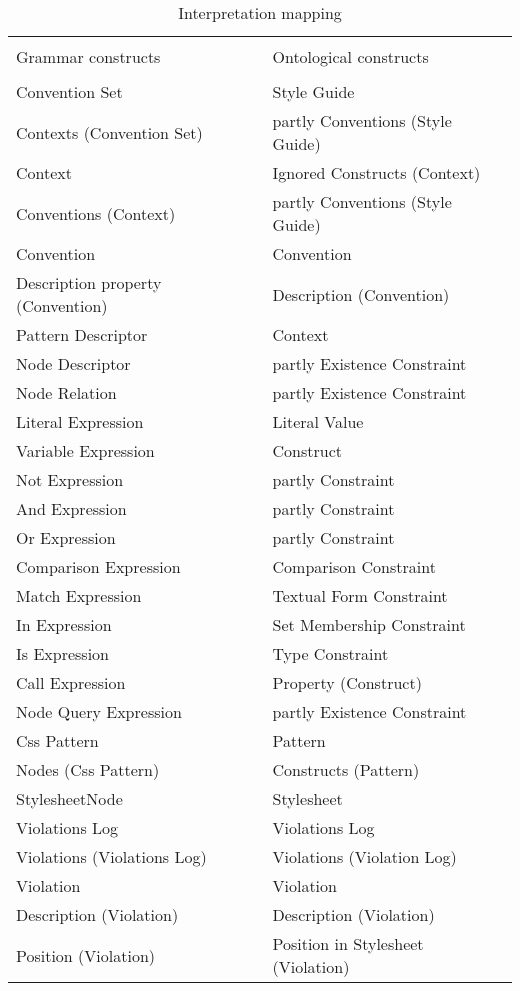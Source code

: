 \documentclass[parskip=full]{uvamscse}
\begin{document}
\begin{center}
\begin{longtable}{ | p{20em} | p{20em} | } 
\caption{Interpretation mapping}
\label{tab:interpretation}\\
\hline
 &  \\
Grammar constructs & Ontological constructs  \\
 &  \\
\hline

Convention Set & Style Guide \\ \hline
Contexts (Convention Set) & partly Conventions (Style Guide) \\ \hline
Context & Ignored Constructs (Context) \\ \hline
Conventions (Context) & partly Conventions (Style Guide) \\ \hline
Convention & Convention \\ \hline
Description property (Convention) & Description (Convention) \\ \hline
Pattern Descriptor & Context \\ \hline
Node Descriptor & partly Existence Constraint \\ \hline
Node Relation & partly Existence Constraint \\ \hline

Literal Expression & Literal Value \\ \hline
Variable Expression & Construct \\ \hline
Not Expression & partly Constraint \\ \hline
And Expression & partly Constraint \\ \hline
Or Expression & partly Constraint \\ \hline
Comparison Expression & Comparison Constraint \\ \hline
Match Expression & Textual Form Constraint \\ \hline
In Expression & Set Membership Constraint \\ \hline
Is Expression & Type Constraint \\ \hline
Call Expression & Property (Construct) \\ \hline
Node Query Expression & partly Existence Constraint \\ \hline

Css Pattern & Pattern \\ \hline
Nodes (Css Pattern) & Constructs (Pattern) \\ \hline
StylesheetNode & Stylesheet \\ \hline
Violations Log & Violations Log \\ \hline
Violations (Violations Log) & Violations (Violation Log) \\ \hline
Violation & Violation \\ \hline
Description (Violation) & Description (Violation) \\ \hline
Position (Violation) & Position in Stylesheet (Violation) \\ \hline
\end{longtable}
\end{center}
\end{document}
